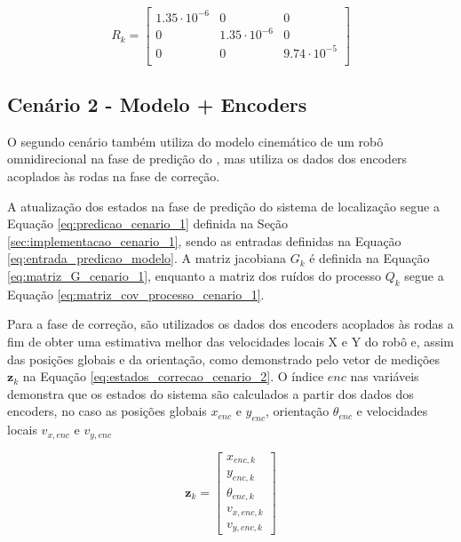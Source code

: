 \documentclass[acronym, symbols, table, deposito]{fei}
\begin{document}
	 		\begin{equation} \label{eq:matriz_cov_medicoes_cenario_1}
	 			R_{k} = \begin{bmatrix}
	 				1.35\cdot10^{-6} & 0 & 0 \\
	 				0 & 1.35\cdot10^{-6} & 0 \\
	 				0 & 0 & 9.74\cdot10^{-5} \\
	 			\end{bmatrix}
	 		\end{equation}
		
		\subsection{Cenário 2 - Modelo + Encoders} \label{sec:implementacao_cenario_2}
		
			O segundo cenário também utiliza do modelo cinemático de um robô omnidirecional na fase de predição do , mas utiliza os dados dos encoders acoplados às rodas na fase de correção.
			
			A atualização dos estados na fase de predição do sistema de localização segue a Equação \eqref{eq:predicao_cenario_1} definida na Seção \ref{sec:implementacao_cenario_1}, sendo as entradas definidas na Equação \eqref{eq:entrada_predicao_modelo}. A matriz jacobiana $G_k$ é definida na Equação \eqref{eq:matriz_G_cenario_1}, enquanto a matriz dos ruídos do processo $Q_k$ segue a Equação \eqref{eq:matriz_cov_processo_cenario_1}.
			
			Para a fase de correção, são utilizados os dados dos encoders acoplados às rodas a fim de obter uma estimativa melhor das velocidades locais X e Y do robô e, assim das posições globais e da orientação, como demonstrado pelo vetor de medições $\textbf{z}_k$ na Equação \eqref{eq:estados_correcao_cenario_2}. O índice $enc$ nas variáveis demonstra que os estados do sistema são calculados a partir dos dados dos encoders, no caso as posições globais $x_{enc}$ e $y_{enc}$, orientação $\theta_{enc}$ e velocidades locais $v_{x,enc}$ e $v_{y,enc}$
			
	 		\begin{equation}\label{eq:estados_correcao_cenario_2}
				\textbf{z}_k  = 
				\begin{bmatrix}
					x_{enc,k} \\
					y_{enc,k} \\
					\theta_{enc,k} \\
					v_{x,enc,k} \\
					v_{y,enc,k}
				\end{bmatrix}
			\end{equation}
		
\end{document}
